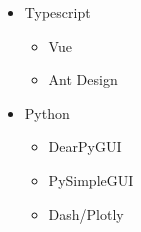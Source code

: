 \begin{itemize}
    \item Typescript
    \begin{itemize}
        \item Vue
        \item Ant Design
    \end{itemize}
    \item Python
    \begin{itemize}
        \item DearPyGUI
        \item PySimpleGUI
        \item Dash/Plotly
    \end{itemize}
\end{itemize}